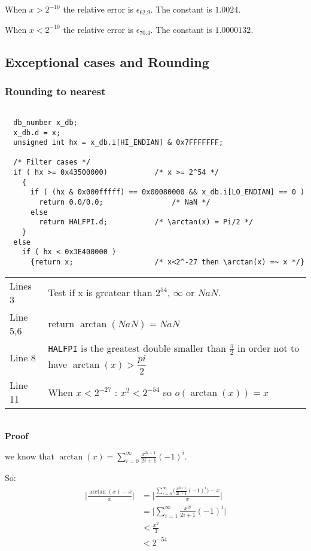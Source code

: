 When $x>2^{-10}$ the relative error is $\epsilon_{62.9}$. The
constant is $1.0024$. 

When $x<2^{-10}$ the relative error is $\epsilon_{70.4}$. The
constant is $1.0000132$. 

\bigskip

\subsection{Exceptional cases and Rounding}
\subsubsection{Rounding to nearest}
\begin{lstlisting}[caption={Exceptional cases : rounding to nearest},firstnumber=1]

  db_number x_db;
  x_db.d = x;
  unsigned int hx = x_db.i[HI_ENDIAN] & 0x7FFFFFFF; 

  /* Filter cases */
  if ( hx >= 0x43500000)           /* x >= 2^54 */
    {
      if ( (hx & 0x000fffff) == 0x00080000 && x_db.i[LO_ENDIAN] == 0 ) 
        return 0.0/0.0;                /* NaN */
      else
        return HALFPI.d;           /* \arctan(x) = Pi/2 */
    }
  else
    if ( hx < 0x3E400000 )
      {return x;                   /* x<2^-27 then \arctan(x) =~ x */}

\end{lstlisting}
\begin{tabular}{ll}
Lines 3 & Test if x is greatear than $2^{54}$, $\infty$ or $NaN$. \\
Line 5,6 & return $\arctan(NaN) = NaN$\\
Line 8 & \texttt{HALFPI} is the greatest double smaller than
$\frac{\pi}{2}$ in order not to have $\arctan(x) > \dfrac{pi}{2}$ \\
Line 11 & When $x<2^{-27}$ : $x^2 < 2^{-54}$ so $o(\arctan(x)) = x$
\end{tabular}
\\

\textbf{Proof}

 we know that $\arctan(x) = \displaystyle {\sum_{i=0}^{\infty}
\frac{x^{2i+1}}{2i+1}(-1)^i}$.

So:
\begin{equation}
   \begin{split}
       \Big| \frac{\arctan(x)-x}{x}  \Big| & = 
       \Bigg|\frac{ \displaystyle {\sum_{i=0}^{\infty}
       \Big( \frac{x^{2i+1}}{2i+1}(-1)^i} \Big) - x}{x} \Bigg|
       \nonumber\\
       & = \Big|\displaystyle {\sum_{i=1}^{\infty}}
       \frac{x^{2i}}{2i+1}(-1)^i\Big|\nonumber \\ 
       & < \frac{x^2}{3}\nonumber \\
       & < 2^{-54} \nonumber
   \end{split}
\end{equation}

